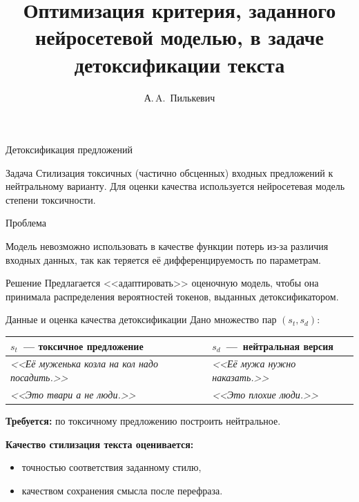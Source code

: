 \documentclass[12pt, fleqn, xcolor=x11names, xcolor=table, aspectratio=169]{beamer}
\title{Оптимизация критерия, заданного нейросетевой моделью, в задаче детоксификации текста}
\author[А.\,A.~Пилькевич]{А.\,A.~Пилькевич}
\institute{Московский физико-технический институт}
\date{\footnotesize
\par\smallskip\emph{Научный руководитель:} д.ф.-м.н. К.\,В.~Воронцов,  д.ф.-м.н. В.\,В.~Стрижов
\par\smallskip\emph{Консультант:} А.\,С.~Попов
\par\bigskip\small 2022}
\begin{document}
\begin{frame}
\thispagestyle{empty}
\maketitle
\end{frame}

\begin{frame}{Детоксификация предложений}

\begin{alertblock}{Задача}
Стилизация токсичных (частично обсценных) входных предложений к нейтральному варианту. Для оценки качества используется нейросетевая модель степени токсичности.
\end{alertblock}

\begin{alertblock}{Проблема}

Модель невозможно использовать в качестве функции потерь из-за различия входных данных, так как теряется её дифференцируемость по параметрам. 
\end{alertblock}

\begin{alertblock}{Решение}
Предлагается <<адаптировать>> оценочную модель, чтобы она принимала распределения вероятностей токенов, выданных детоксификатором. 
\end{alertblock}

\end{frame}
\begin{frame}{Данные и оценка качества детоксификации}
Дано множество пар  $(s_{t}, s_{d})$:
\begin{table}[ht]
\centering
 \begin{tabular}{|l|l|} 
 \hline 
 $s_{t}$~--- токсичное предложение & $s_{d}$~---~нейтральная версия \\
 \hline
 \textit{<<Её муженька козла на кол надо посадить.>>} & \textit{<<Её мужа нужно наказать.>>} \\
 \textit{<<Это твари а не люди.>>} & \textit{<<Это плохие люди.>>} \\
 \hline
 \end{tabular}
\end{table}


\vfill

\textbf{Требуется:} по токсичному предложению построить нейтральное.

\vfill

\textbf{Качество стилизация текста оценивается:} 
\begin{itemize}
    \item точностью соответствия заданному стилю,
    \item качеством сохранения смысла после перефраза.
\end{itemize}

\end{frame}
\end{document}
